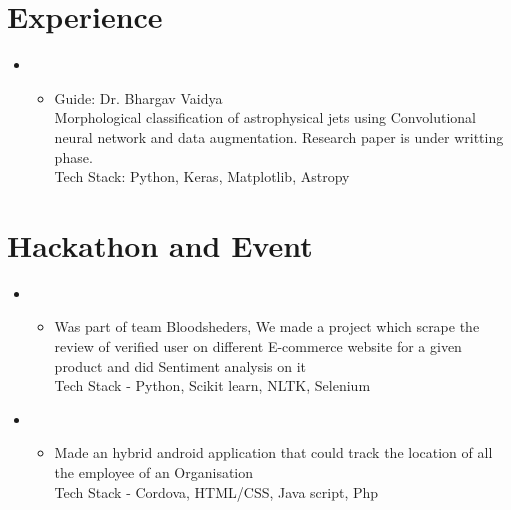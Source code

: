 \documentclass[11pt,a4paper,roman]{moderncv}
\begin{document}
    \makecvtitle
    \small{}



    \section{Experience}
    \vspace{6pt}
    \begin{itemize}
    \item{}
        \begin{itemize}
        \item  Guide: Dr. Bhargav Vaidya\\Morphological classification of astrophysical jets using Convolutional neural network and data augmentation. Research paper is under writting phase.\\Tech Stack: Python, Keras, Matplotlib, Astropy
        \end{itemize}
    \end{itemize}


    \section{Hackathon and Event}
    \vspace{6pt}
    \begin{itemize}
    \item{}
        \begin{itemize}
        \item Was part of team Bloodsheders, We made a project which scrape the review of verified user on different E-commerce website for a given product and did Sentiment analysis on it \\Tech Stack - Python, Scikit learn, NLTK, Selenium\\
        \end{itemize}
    \end{itemize}

    \begin{itemize}
    \item{}
        \begin{itemize}
        \item Made an hybrid android application that could track the location of all the employee of an Organisation\\Tech Stack -  Cordova, HTML/CSS, Java script, Php
        \end{itemize}
    \end{itemize}
\end{document}
